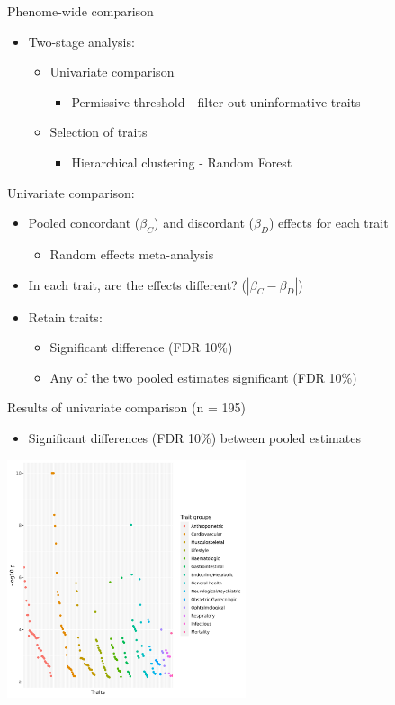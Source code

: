 \documentclass[presentation]{beamer}
\begin{document}
\begin{frame}[label={sec:orgf77fff0}]{Phenome-wide comparison}
\begin{itemize}
\item Two-stage analysis:
\begin{itemize}
\item Univariate comparison
\begin{itemize}
\item Permissive threshold - filter out uninformative traits
\end{itemize}
\item Selection of traits
\begin{itemize}
\item Hierarchical clustering - Random Forest
\end{itemize}
\end{itemize}
\end{itemize}
\end{frame}

\begin{frame}[label={sec:org202d2d0}]{Univariate comparison:}
\begin{itemize}
\item Pooled concordant (\(\beta_C\)) and discordant (\(\beta_D\)) effects for each trait
\begin{itemize}
\item Random effects meta-analysis
\end{itemize}
\item In each trait, are the effects different? (\(|\beta_C - \beta_D|\))
\item Retain traits:
\begin{itemize}
\item Significant difference (FDR 10\%)
\item Any of the two pooled estimates significant (FDR 10\%)
\end{itemize}
\end{itemize}
\end{frame}

\begin{frame}[label={sec:orgd596f81}]{Results of univariate comparison (n = 195)}
\begin{itemize}
\item Significant differences (FDR 10\%) between pooled estimates
\end{itemize}
\begin{center}
\includegraphics[width=7cm]{./plots/phewas_res.png}
\end{center}
\end{frame}
\end{document}
